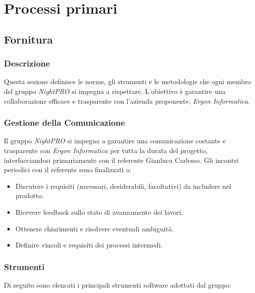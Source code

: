 \documentclass[a4paper, 11pt, oneside]{scrartcl} %
\begin{document}
\newpage
\section{Processi primari}
\subsection{Fornitura}
\subsubsection{Descrizione} Questa sezione definisce le norme, gli strumenti e le metodologie che ogni membro del gruppo \textit{NightPRO} si impegna a rispettare. L'obiettivo è garantire una collaborazione efficace e trasparente con l'azienda proponente{\scriptsize{}}, \textit{Ergon Informatica}.

\subsubsection{Gestione della Comunicazione} Il gruppo \textit{NightPRO} si impegna a garantire una comunicazione costante e trasparente con \textit{Ergon Informatica} per tutta la durata del progetto, interfacciandosi primariamente con il referente Gianluca Carlesso. Gli incontri periodici con il referente sono finalizzati a: \begin{itemize} 
    \item Discutere i requisiti{\scriptsize{}} (necessari, desiderabili, facoltativi) da includere nel prodotto. 
    \item Ricevere feedback{\scriptsize{}} sullo stato di avanzamento dei lavori. 
    \item Ottenere chiarimenti e risolvere eventuali ambiguità. 
    \item Definire vincoli e requisiti dei processi intermedi. 
\end{itemize}

\subsubsection{Strumenti}
Di seguito sono elencati i principali strumenti software adottati dal gruppo:
\end{document}
